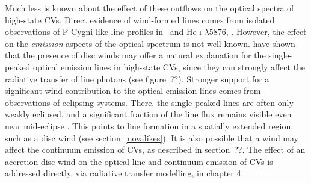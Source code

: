 Much less is known about the effect of these outflows on the optical
spectra of high-state CVs. Direct evidence of wind-formed lines comes from
isolated observations of P-Cygni-like line profiles in
\ha\ and He \textsc{i} $\lambda5876$, \citep{patterson1996, RN98, kafka2004}. 
However, the effect on
the {\em emission} aspects of the optical spectrum is not well known.
\cite{MC96, MC97} have shown that the presence of disc winds may
offer a natural explanation for the single-peaked optical emission lines in
high-state CVs, since they can strongly affect the radiative transfer
of line photons (see figure~??). Stronger support for a significant wind contribution to the
optical emission lines comes from observations of eclipsing
systems. There, the single-peaked lines are often only weakly
eclipsed, and a significant fraction of the line flux remains visible
even near mid-eclipse \citep[e.g.][]{baptista2000,groot2004}. 
This points to line formation in a spatially
extended region, such as a disc wind (see section~\ref{novalikes}).
It is also possible that a wind may affect the continuum emission of CVs,
as described in section~??. The effect of an accretion disc wind
on the optical line and continuum emission of CVs is addressed directly,
via radiative transfer modelling, in chapter 4.



